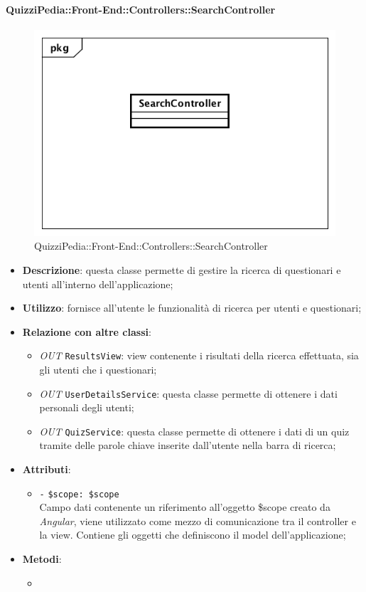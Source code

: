 \paragraph{QuizziPedia::Front-End::Controllers::SearchController}
\begin{figure}
	\centering
	\includegraphics[scale=0.45]{UML/Classi/Front-End/QuizziPedia_Front-end_Controller_SearchController.png}
	\caption{QuizziPedia::Front-End::Controllers::SearchController}
\end{figure}
\begin{itemize}
	\item \textbf{Descrizione}: questa classe permette di gestire la ricerca di questionari e utenti all'interno dell'applicazione;
	\item \textbf{Utilizzo}: fornisce all'utente le funzionalità di ricerca per utenti e questionari;
	\item \textbf{Relazione con altre classi}:
	\begin{itemize}
		\item \textit{OUT} \texttt{ResultsView}: view contenente i risultati della ricerca effettuata, sia gli utenti che i questionari;
		\item \textit{OUT} \texttt{UserDetailsService}: questa classe permette di ottenere i dati personali degli utenti;
		\item \textit{OUT} \texttt{QuizService}: questa classe permette di ottenere i dati di un quiz tramite delle parole chiave inserite dall'utente nella barra di ricerca;
	\end{itemize}
	\item \textbf{Attributi}:
	\begin{itemize}
		\item \texttt{-} \texttt{\$scope: \$scope} \\
		Campo dati contenente un riferimento all’oggetto \$scope creato da \textit{Angular}, viene utilizzato come mezzo di comunicazione tra il controller e la view. Contiene gli oggetti che definiscono il model dell’applicazione;
	\end{itemize}
	\item \textbf{Metodi}:
	\begin{itemize}
		\item 
	\end{itemize}
\end{itemize}

